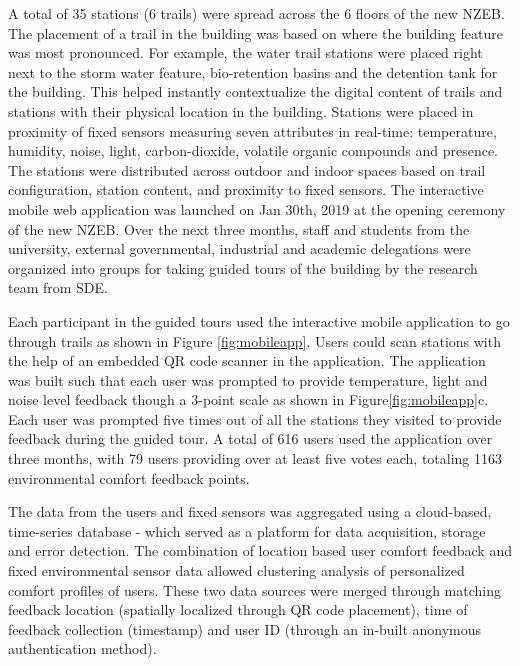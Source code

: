 A total of 35 stations (6 trails) were spread across the 6 floors of the new NZEB. The placement of a trail in the building was based on where the building feature was most pronounced. For example, the water trail stations were placed right next to the storm water feature, bio-retention basins and the detention tank for the building. This helped instantly contextualize the digital content of trails and stations with their physical location in the building. Stations were placed in proximity of fixed sensors measuring seven attributes in real-time: temperature, humidity, noise, light, carbon-dioxide, volatile organic compounds and presence. The stations were distributed across outdoor and indoor spaces based on trail configuration, station content, and proximity to fixed sensors. The interactive mobile web application was launched on Jan 30th, 2019 at the opening ceremony of the new NZEB. Over the next three months, staff and students from the university, external governmental, industrial and academic delegations were organized into groups for taking guided tours of the building by the research team from SDE.

Each participant in the guided tours used the interactive mobile application to go through trails as shown in Figure \ref{fig:mobileapp}. Users could scan stations with the help of an embedded QR code scanner in the application. The application was built such that each user was prompted to provide temperature, light and noise level feedback though a 3-point scale as shown in Figure\ref{fig:mobileapp}c. Each user was prompted five times out of all the stations they visited to provide feedback during the guided tour. A total of 616 users used the application over three months, with 79 users providing over at least five votes each, totaling 1163 environmental comfort feedback points. 

The data from the users and fixed sensors was aggregated using a cloud-based, time-series database - which served as a platform for data acquisition, storage and error detection. The combination of location based user comfort feedback and fixed environmental sensor data allowed clustering analysis of personalized comfort profiles of users. These two data sources were merged through matching feedback location (spatially localized through QR code placement), time of feedback collection (timestamp) and user ID (through an in-built anonymous authentication method). 

